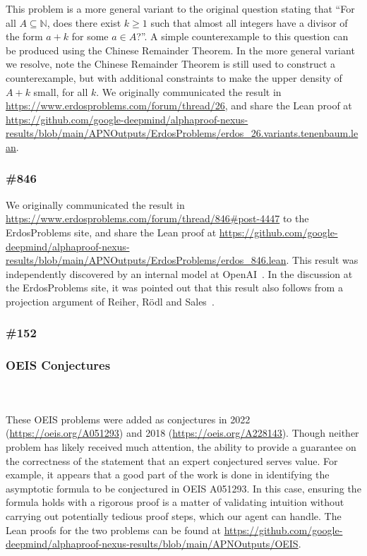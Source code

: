 This problem is a more general variant to the original question stating that ``For all $A \subseteq \mathbb{N}$, does there exist $k \geq 1$ such that almost all integers have a divisor of the form $a + k$ for some $a \in A$?''. A simple counterexample to this question can be produced using the Chinese Remainder Theorem. In the more general variant we resolve, note the Chinese Remainder Theorem is still used to construct a counterexample, but with additional constraints to make the upper density of $A+k$ small, for all $k$. We originally communicated the result in \url{https://www.erdosproblems.com/forum/thread/26}, and share the Lean proof at \url{https://github.com/google-deepmind/alphaproof-nexus-results/blob/main/APNOutputs/ErdosProblems/erdos_26.variants.tenenbaum.lean}.
\subsubsection*{{\erdos} \#846}


We originally communicated the result in \url{https://www.erdosproblems.com/forum/thread/846#post-4447} to the
ErdosProblems site, and share the Lean proof at \url{https://github.com/google-deepmind/alphaproof-nexus-results/blob/main/APNOutputs/ErdosProblems/erdos_846.lean}. This result was independently discovered by an internal model at OpenAI~\cite{putterman2026infinite}. In the discussion at the ErdosProblems site, it was pointed out that this result also follows from a projection argument of Reiher, R\"odl and Sales~\cite{reiher2024colouring}.

\subsubsection*{{\erdos} \#152}



\subsubsection*{OEIS Conjectures}

\\\\


These OEIS problems were added as conjectures in 2022 (\url{https://oeis.org/A051293}) and 2018 (\url{https://oeis.org/A228143}). Though neither problem has likely received much attention, the ability to provide a guarantee on the correctness of the statement that an expert conjectured serves value. For example, it appears that a good part of the work is done in identifying the asymptotic formula to be conjectured in OEIS A051293. In this case, ensuring the formula holds with a rigorous proof is a matter of validating intuition without carrying out potentially tedious proof steps, which our agent can handle. The Lean proofs for the two problems can be found at \url{https://github.com/google-deepmind/alphaproof-nexus-results/blob/main/APNOutputs/OEIS}.

